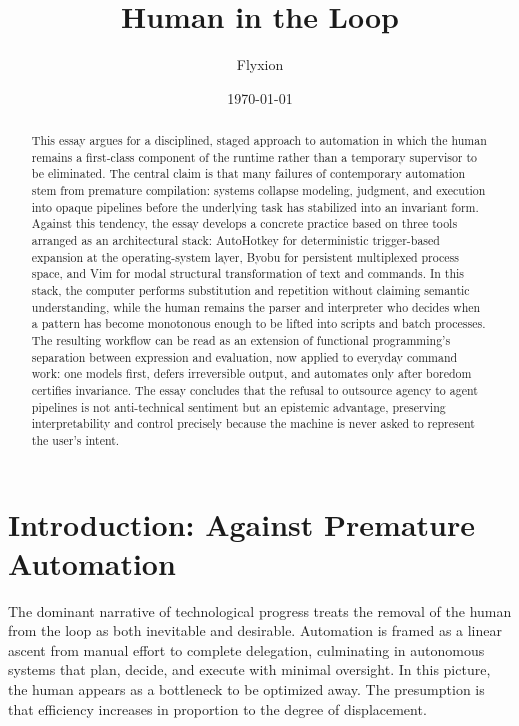 \documentclass[11pt]{article}
\title{Human in the Loop}
\author{Flyxion}
\date{\today}
\begin{document}
\maketitle

\begin{abstract}
This essay argues for a disciplined, staged approach to automation in which the human remains a first-class component of the runtime rather than a temporary supervisor to be eliminated. The central claim is that many failures of contemporary automation stem from premature compilation: systems collapse modeling, judgment, and execution into opaque pipelines before the underlying task has stabilized into an invariant form. Against this tendency, the essay develops a concrete practice based on three tools arranged as an architectural stack: AutoHotkey for deterministic trigger-based expansion at the operating-system layer, Byobu for persistent multiplexed process space, and Vim for modal structural transformation of text and commands. In this stack, the computer performs substitution and repetition without claiming semantic understanding, while the human remains the parser and interpreter who decides when a pattern has become monotonous enough to be lifted into scripts and batch processes. The resulting workflow can be read as an extension of functional programming’s separation between expression and evaluation, now applied to everyday command work: one models first, defers irreversible output, and automates only after boredom certifies invariance. The essay concludes that the refusal to outsource agency to agent pipelines is not anti-technical sentiment but an epistemic advantage, preserving interpretability and control precisely because the machine is never asked to represent the user’s intent.
\end{abstract}

\newpage
\section{Introduction: Against Premature Automation}

The dominant narrative of technological progress treats the removal of the human from the loop as both inevitable and desirable. Automation is framed as a linear ascent from manual effort to complete delegation, culminating in autonomous systems that plan, decide, and execute with minimal oversight. In this picture, the human appears as a bottleneck to be optimized away. The presumption is that efficiency increases in proportion to the degree of displacement.
\end{document}
